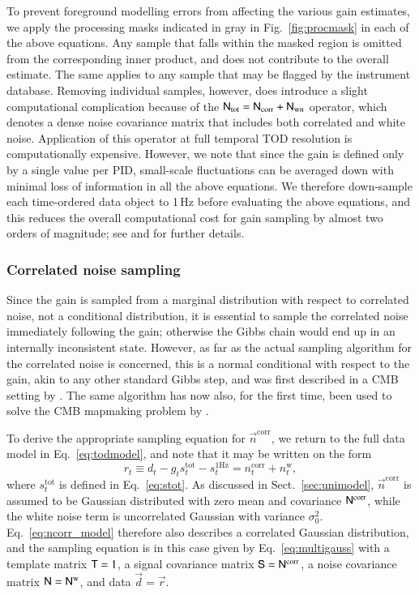 \documentclass[onecolumn]{aa}
\renewcommand{\d}[0]{\vec{d}}
\newcommand{\n}[0]{\vec{n}}
\newcommand{\T}[0]{\tens{T}}
\newcommand{\N}[0]{\tens{N}}
\renewcommand{\S}[0]{\tens{S}}
\renewcommand{\r}[0]{\vec{r}}
\begin{document}
To prevent foreground modelling errors from affecting the various gain
estimates, we apply the processing masks indicated in gray in
Fig.~\ref{fig:procmask} in each of the above equations. Any sample
that falls within the masked region is omitted from the corresponding
inner product, and does not contribute to the overall estimate. The
same applies to any sample that may be flagged by the instrument
database. Removing individual samples, however, does introduce a
slight computational complication because of the
$\N_{\mathrm{tot}}=\N_{\mathrm{corr}}+\N_{\mathrm{wn}}$ operator,
which denotes a dense noise covariance matrix that includes both
correlated and white noise. Application of this operator at full
temporal TOD resolution is computationally expensive. However, we note
that since the gain is defined only by a single value per PID,
small-scale fluctuations can be averaged down with minimal loss of
information in all the above equations. We therefore down-sample each
time-ordered data object to 1\,Hz before evaluating the above
equations, and this reduces the overall computational cost for gain
sampling by almost two orders of magnitude; see \citet{bp07} and \citet{bp06} for
further details.

\subsubsection{Correlated noise sampling}
\label{sec:ncorr}

Since the gain is sampled from a marginal distribution with respect to
correlated noise, not a conditional distribution, it is essential to
sample the correlated noise immediately following the gain; otherwise
the Gibbs chain would end up in an internally inconsistent
state. However, as far as the actual sampling algorithm for the
correlated noise is concerned, this is a normal conditional with
respect to the gain, akin to any other standard Gibbs step, and was
first described in a CMB setting by \citet{wehus:2012}. The same
algorithm has now also, for the first time, been used to solve the CMB
mapmaking problem by \citet{bp02}.

To derive the appropriate sampling equation for $\n^{\mathrm{corr}}$,
we return to the full data model in Eq.~\eqref{eq:todmodel}, and note
that it may be written on the form
\begin{equation}
  r_{t} \equiv d_{t} - g_{t} s^{\mathrm{tot}}_{t} - s^{\mathrm{1Hz}}_t =
  n^{\mathrm{corr}}_{t} + n^{\mathrm{w}}_{t},
  \label{eq:ncorr_model}
\end{equation}
where $s^{\mathrm{tot}}_{t}$ is defined in Eq.~\eqref{eq:stot}. As
discussed in Sect.~\ref{sec:unimodel}, $\n^{\mathrm{corr}}$ is assumed
to be Gaussian distributed with zero mean and covariance
$\N^{\mathrm{corr}}$, while the white noise term is uncorrelated
Gaussian with variance $\sigma_0^2$. Eq.~\eqref{eq:ncorr_model}
therefore also describes a correlated Gaussian distribution, and the
sampling equation is in this case given by Eq.~\eqref{eq:multigauss}
with a template matrix $\T=1$, a signal covariance matrix $\S =
\N^{\mathrm{corr}}$, a noise covariance matrix $\N = \N^{\mathrm{w}}$,
and data $\d=\r$.
\end{document}

